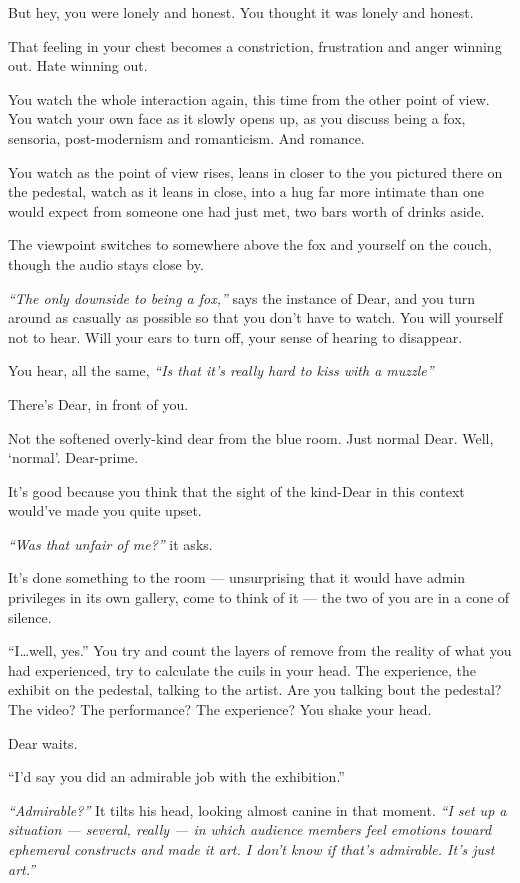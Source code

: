 But hey, you were lonely and honest. You thought it was lonely and honest.

That feeling in your chest becomes a constriction, frustration and anger winning out. Hate winning out.

You watch the whole interaction again, this time from the other point of view. You watch your own face as it slowly opens up, as you discuss being a fox, sensoria, post-modernism and romanticism. And romance.

You watch as the point of view rises, leans in closer to the you pictured there on the pedestal, watch as it leans in close, into a hug far more intimate than one would expect from someone one had just met, two bars worth of drinks aside.

The viewpoint switches to somewhere above the fox and yourself on the couch, though the audio stays close by.

\emph{``The only downside to being a fox,''} says the instance of Dear, and you turn around as casually as possible so that you don't have to watch. You will yourself not to hear. Will your ears to turn off, your sense of hearing to disappear.

You hear, all the same, \emph{``Is that it's really hard to kiss with a muzzle''}

There's Dear, in front of you.

Not the softened overly-kind dear from the blue room. Just normal Dear. Well, `normal'. Dear-prime.

It's good because you think that the sight of the kind-Dear in this context would've made you quite upset.

\emph{``Was that unfair of me?''} it asks.

It's done something to the room --- unsurprising that it would have admin privileges in its own gallery, come to think of it --- the two of you are in a cone of silence.

``I\ldots{}well, yes.'' You try and count the layers of remove from the reality of what you had experienced, try to calculate the cuils in your head. The experience, the exhibit on the pedestal, talking to the artist. Are you talking bout the pedestal? The video? The performance? The experience? You shake your head.

Dear waits.

``I'd say you did an admirable job with the exhibition.''

\emph{``Admirable?''} It tilts his head, looking almost canine in that moment. \emph{``I set up a situation --- several, really --- in which audience members feel emotions toward ephemeral constructs and made it art. I don't know if that's admirable. It's just art.''}

